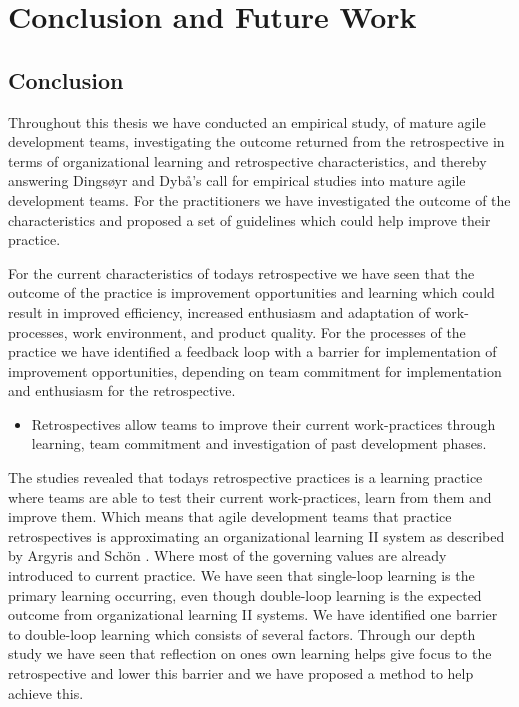 \chapter{Conclusion and Future Work}
\section{Conclusion}
Throughout this thesis we have conducted an empirical study, of mature agile development teams, investigating the outcome returned from the retrospective in terms of organizational learning and retrospective characteristics, and thereby answering Dingsøyr and Dybå’s call \cite{Dyba2008} for empirical studies into mature agile development teams. For the practitioners we have investigated the outcome of the characteristics and proposed a set of guidelines which could help improve their practice.

For the current characteristics of todays retrospective we have seen that the outcome of the practice is improvement opportunities and learning which could result in improved efficiency, increased enthusiasm and adaptation of work-processes, work environment, and product quality. For the processes of the practice we have identified a feedback loop with a barrier for implementation of improvement opportunities, depending on team commitment for implementation and enthusiasm for the retrospective. 

\begin{itemize}
\item Retrospectives allow teams to improve their current work-practices through learning, team commitment and investigation of past development phases.
\end{itemize}

The studies revealed that todays retrospective practices is a learning practice where teams are able to test their current work-practices, learn from them and improve them. Which means that agile development teams that practice retrospectives is approximating an organizational learning II system as described by Argyris and Schön \cite{Argyris1996}. Where most of the governing values are already introduced to current practice. We have seen that single-loop learning is the primary learning occurring, even though double-loop learning is the expected outcome from organizational learning II systems. We have identified one barrier to double-loop learning which consists of several factors. Through our depth study we have seen that reflection on ones own learning helps give focus to the retrospective and lower this barrier and we have proposed a method to help achieve this. 

